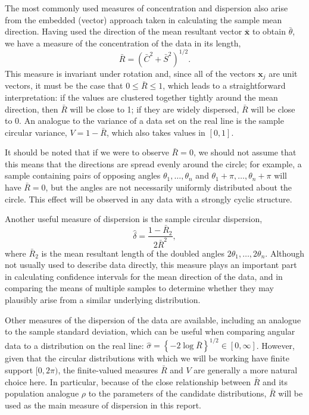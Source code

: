 \documentclass[../../ArchStats.tex]{subfiles}
\begin{document}
The most commonly used measures of concentration and dispersion also arise from the embedded (vector) approach taken in calculating the sample mean direction. Having used the direction of the mean resultant vector $\mathbf{\bar{x}}$ to obtain $\bar{\theta}$, we have a measure of the concentration of the data in its length, 
\[\bar{R} = (\bar{C}^2 + \bar{S}^2)^{1/2}.\]
This measure is invariant under rotation and, since all of the vectors $\mathbf{x}_j$ are unit vectors, it must be the case that $0 \leq \bar{R} \leq 1$, which leads to a straightforward interpretation: if the values are clustered together tightly around the mean direction, then $\bar{R}$ will be close to 1; if they are widely dispersed, $\bar{R}$ will be close to 0. An analogue to the variance of a data set on the real line is the sample circular variance, $V = 1- \bar{R}$, which also takes values in $[0,1]$. 

It should be noted that if we were to observe $\bar{R} = 0$, we should not assume that this means that the directions are spread evenly around the circle; for example, a sample containing pairs of opposing angles $\theta_1, \dots, \theta_n$ and $\theta_1+\pi, \dots, \theta_n+\pi$ will have $\bar{R} = 0$, but the angles are not necessarily uniformly distributed about the circle. This effect will be observed in any data with a strongly cyclic structure.

Another useful measure of dispersion is the sample circular dispersion,
\[\hat{\delta} = \frac{1-\bar{R}_2}{2\bar{R}^2},\]
where $\bar{R}_2$ is the mean resultant length of the doubled angles $2\theta_1, \dots, 2\theta_n$. Although not usually used to describe data directly, this measure plays an important part in calculating confidence intervals for the mean direction of the data, and in comparing the means of multiple samples to determine whether they may plausibly arise from a similar underlying distribution. 

Other measures of the dispersion of the data are available, including an analogue to the  sample standard deviation, which can be useful when comparing angular data to a distribution on the real line: $\hat{\sigma} = \left\lbrace -2 \log \bar{R} \right\rbrace ^{1/2} \in [0, \infty]$. However, given that the circular distributions with which we will be working have finite support $[0, 2\pi)$, the finite-valued measures $\bar{R}$ and $V$ are generally a more natural choice here. In particular, because of the close relationship between $\bar{R}$ and its population analogue $\rho$ to the parameters of the candidate distributions, $\bar{R}$ will be used as the main measure of dispersion in this report.
\end{document}

